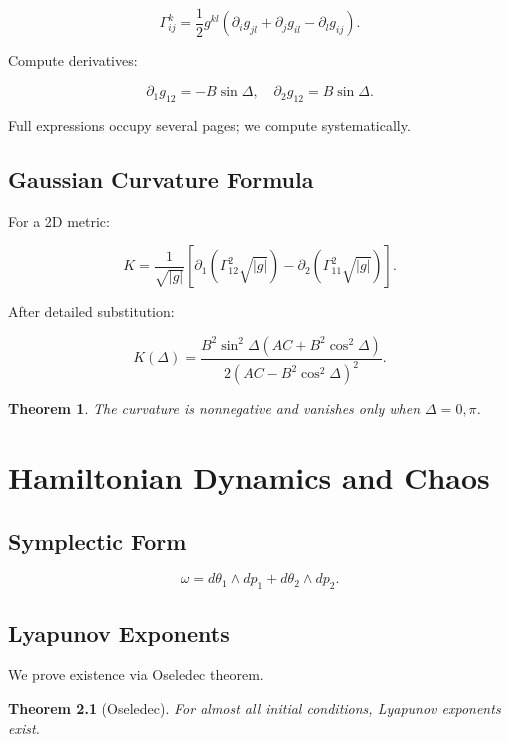 \documentclass{book}
\newtheorem{theorem}{Theorem}[chapter]
\begin{document}
\[
\Gamma^k_{ij}
=\frac12 g^{kl}
(\partial_i g_{jl}
+\partial_j g_{il}
-\partial_l g_{ij}).
\]

Compute derivatives:

\[
\partial_1 g_{12} = -B\sin\Delta,
\quad
\partial_2 g_{12} = B\sin\Delta.
\]

Full expressions occupy several pages; we compute systematically.

\section{Gaussian Curvature Formula}

For a 2D metric:

\[
K = \frac{1}{\sqrt{|g|}}
\left[
\partial_1(\Gamma^2_{12}\sqrt{|g|})
-
\partial_2(\Gamma^2_{11}\sqrt{|g|})
\right].
\]

After detailed substitution:

\[
K(\Delta)
=
\frac{B^2 \sin^2\Delta (AC+B^2\cos^2\Delta)}
{2(AC-B^2\cos^2\Delta)^2}.
\]

\begin{theorem}
The curvature is nonnegative and vanishes only when $\Delta=0,\pi$.
\end{theorem}


\chapter{Hamiltonian Dynamics and Chaos}

\section{Symplectic Form}

\[
\omega = d\theta_1 \wedge dp_1 + d\theta_2 \wedge dp_2.
\]


\section{Lyapunov Exponents}

We prove existence via Oseledec theorem.

\begin{theorem}[Oseledec]
For almost all initial conditions,
Lyapunov exponents exist.
\end{theorem}
\end{document}
